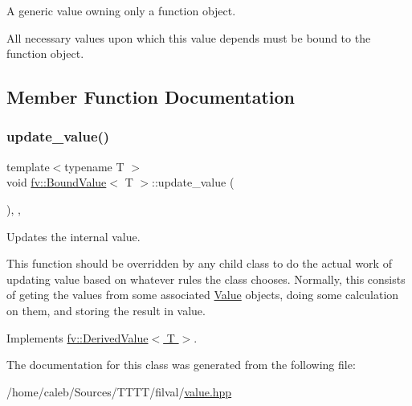 A generic value owning only a function object. 

All necessary values upon which this value depends must be bound to the function object. 

\subsection{Member Function Documentation}
\hypertarget{classfv_1_1BoundValue_a51ba914f1eac694af4264d62785282a1}{}\label{classfv_1_1BoundValue_a51ba914f1eac694af4264d62785282a1} 
\subsubsection{\texorpdfstring{update\+\_\+value()}{update\_value()}}
{\footnotesize\ttfamily template$<$typename T $>$ \\
void \hyperlink{classfv_1_1BoundValue}{fv\+::\+Bound\+Value}$<$ T $>$\+::update\+\_\+value (\begin{DoxyParamCaption}{ }\end{DoxyParamCaption})\hspace{0.3cm}{\ttfamily [inline]}, {\ttfamily [protected]}, {\ttfamily [virtual]}}



Updates the internal value. 

This function should be overridden by any child class to do the actual work of updating value based on whatever rules the class chooses. Normally, this consists of geting the values from some associated \hyperlink{classfv_1_1Value}{Value} objects, doing some calculation on them, and storing the result in value. 

Implements \hyperlink{classfv_1_1DerivedValue_ae59e80a98eb74b95d8961bfe12ee5ec2}{fv\+::\+Derived\+Value$<$ T $>$}.



The documentation for this class was generated from the following file\+:\begin{DoxyCompactItemize}
\item 
/home/caleb/\+Sources/\+T\+T\+T\+T/filval/\hyperlink{value_8hpp}{value.\+hpp}\end{DoxyCompactItemize}
